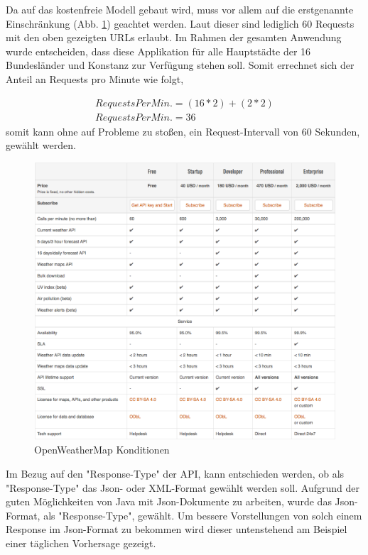 Da auf das kostenfreie Modell gebaut wird, muss vor allem auf die erstgenannte Einschränkung (Abb. \ref{img:OpenWeather}) geachtet werden. Laut dieser sind lediglich 60 Requests mit den oben gezeigten URLs erlaubt. Im Rahmen der gesamten Anwendung wurde entscheiden, dass diese Applikation für alle Hauptstädte der 16 Bundesländer und Konstanz zur Verfügung stehen soll. Somit errechnet sich der Anteil an Requests pro Minute wie folgt,

\begin{align}
RequestsPerMin. = (16*2)+(2*2)\\
RequestsPerMin. = 36
\end{align}
somit kann ohne auf Probleme zu stoßen, ein Request-Intervall von 60 Sekunden, gewählt werden. 

\begin{figure}[!ht]
	\centering
	\includegraphics[width=1.0\textwidth]{Bilder/OpenWeatherMap.png}
	\caption{OpenWeatherMap Konditionen}
	\label{img:OpenWeather}
\end{figure} 
Im Bezug auf den "Response-Type" der API, kann entschieden werden, ob als "Response-Type" das Json- oder XML-Format gewählt werden soll. Aufgrund der guten Möglichkeiten von Java mit Json-Dokumente zu arbeiten, wurde  das Json-Format, als "Response-Type", gewählt.
Um bessere Vorstellungen von solch einem Response im Json-Format zu bekommen wird dieser untenstehend am Beispiel einer täglichen Vorhersage gezeigt.  

